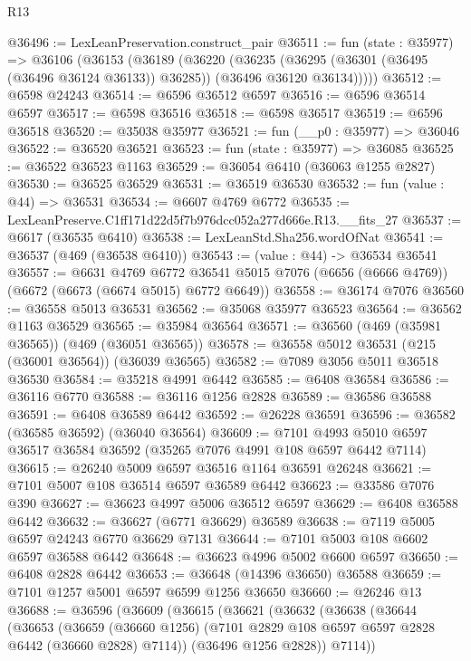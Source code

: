\begin{lexlean}{R13}
\begin{coremodule}
@36496 := LexLeanPreservation.construct_pair
@36511 := fun (state : @35977) =>
  @36106
    (@36153
      (@36189
        (@36220
          (@36235
            (@36295 (@36301 (@36495 (@36496 @36124 @36133)) @36285))
            (@36496 @36120 @36134)))))
@36512 := @6598 @24243
@36514 := @6596 @36512 @6597
@36516 := @6596 @36514 @6597
@36517 := @6598 @36516
@36518 := @6598 @36517
@36519 := @6596 @36518
@36520 := @35038 @35977
@36521 := fun (__p0 : @35977) => @36046
@36522 := @36520 @36521
@36523 := fun (state : @35977) => @36085
@36525 := @36522 @36523 @1163
@36529 := @36054 @6410 (@36063 @1255 @2827)
@36530 := @36525 @36529
@36531 := @36519 @36530
@36532 := fun (value : @44) => @36531
@36534 := @6607 @4769 @6772
@36535 := LexLeanPreserve.C1ff171d22d5f7b976dcc052a277d666e.R13.__fits_27
@36537 := @6617 (@36535 @6410)
@36538 := LexLeanStd.Sha256.wordOfNat
@36541 := @36537 (@469 (@36538 @6410))
@36543 := (value : @44) -> @36534 @36541
@36557 := @6631
    @4769
    @6772
    @36541
    @5015
    @7076
    (@6656 (@6666 @4769))
    (@6672 (@6673 (@6674 @5015) @6772 @6649))
@36558 := @36174 @7076
@36560 := @36558 @5013 @36531
@36562 := @35068 @35977 @36523
@36564 := @36562 @1163 @36529
@36565 := @35984 @36564
@36571 := @36560 (@469 (@35981 @36565)) (@469 (@36051 @36565))
@36578 := @36558 @5012 @36531 (@215 (@36001 @36564)) (@36039 @36565)
@36582 := @7089 @3056 @5011 @36518 @36530
@36584 := @35218 @4991 @6442
@36585 := @6408 @36584
@36586 := @36116 @6770
@36588 := @36116 @1256 @2828
@36589 := @36586 @36588
@36591 := @6408 @36589 @6442
@36592 := @26228 @36591
@36596 := @36582 (@36585 @36592) (@36040 @36564)
@36609 := @7101 @4993 @5010 @6597 @36517 @36584 @36592 (@35265 @7076 @4991 @108 @6597 @6442 @7114)
@36615 := @26240 @5009 @6597 @36516 @1164 @36591 @26248
@36621 := @7101 @5007 @108 @36514 @6597 @36589 @6442
@36623 := @33586 @7076 @390
@36627 := @36623 @4997 @5006 @36512 @6597
@36629 := @6408 @36588 @6442
@36632 := @36627 (@6771 @36629) @36589
@36638 := @7119 @5005 @6597 @24243 @6770 @36629 @7131
@36644 := @7101 @5003 @108 @6602 @6597 @36588 @6442
@36648 := @36623 @4996 @5002 @6600 @6597
@36650 := @6408 @2828 @6442
@36653 := @36648 (@14396 @36650) @36588
@36659 := @7101 @1257 @5001 @6597 @6599 @1256 @36650
@36660 := @26246 @13
@36688 := @36596
    (@36609
      (@36615
        (@36621
          (@36632
            (@36638
              (@36644
                (@36653
                  (@36659
                    (@36660 @1256)
                    (@7101 @2829 @108 @6597 @6597 @2828 @6442 (@36660 @2828) @7114))
                  (@36496 @1256 @2828))
                @7114))

\end{coremodule}
\end{lexlean}
